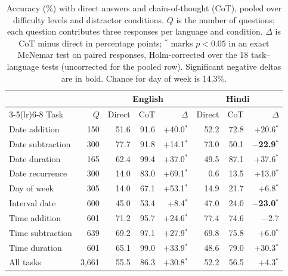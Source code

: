 \begin{table}[t]
\centering
\begin{tabular}{lrrrrrrr}
\toprule
 & & \multicolumn{3}{c}{English} & \multicolumn{3}{c}{Hindi} \\
\cmidrule(lr){3-5}\cmidrule(lr){6-8}
Task & $Q$ & Direct & CoT & $\Delta$ & Direct & CoT & $\Delta$ \\
\midrule
Date addition & 150 & 51.6 & 91.6 & +40.0$^{*}$ & 52.2 & 72.8 & +20.6$^{*}$ \\
Date subtraction & 300 & 77.7 & 91.8 & +14.1$^{*}$ & 73.0 & 50.1 & \textbf{$-$22.9$^{*}$} \\
Date duration & 165 & 62.4 & 99.4 & +37.0$^{*}$ & 49.5 & 87.1 & +37.6$^{*}$ \\
Date recurrence & 300 & 14.0 & 83.0 & +69.1$^{*}$ & 0.6 & 13.5 & +13.0$^{*}$ \\
Day of week & 305 & 14.0 & 67.1 & +53.1$^{*}$ & 14.9 & 21.7 & +6.8$^{*}$ \\
Interval date & 600 & 45.0 & 53.4 & +8.4$^{*}$ & 47.0 & 24.0 & \textbf{$-$23.0$^{*}$} \\
Time addition & 601 & 71.2 & 95.7 & +24.6$^{*}$ & 77.4 & 74.6 & $-$2.7\phantom{$^{*}$} \\
Time subtraction & 639 & 69.2 & 97.1 & +27.9$^{*}$ & 69.8 & 75.8 & +6.0$^{*}$ \\
Time duration & 601 & 65.1 & 99.0 & +33.9$^{*}$ & 48.6 & 79.0 & +30.3$^{*}$ \\
\midrule
All tasks & 3,661 & 55.5 & 86.3 & +30.8$^{*}$ & 52.2 & 56.5 & +4.3$^{*}$ \\
\bottomrule
\end{tabular}
\caption{Accuracy (\%) with direct answers and chain-of-thought (CoT), pooled over difficulty levels and distractor conditions. $Q$ is the number of questions; each question contributes three responses per language and condition. $\Delta$ is CoT minus direct in percentage points; $^{*}$ marks $p<0.05$ in an exact McNemar test on paired responses, Holm-corrected over the 18 task--language tests (uncorrected for the pooled row). Significant negative deltas are in bold. Chance for day of week is 14.3\%.}
\label{tab:cot-delta}
\end{table}
